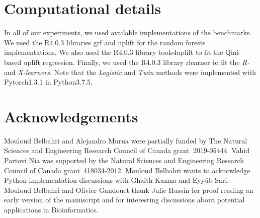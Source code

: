 \documentclass{article}
\let\proglang=\textsf
\newcommand{\pkg}[1]{{\fontseries{b}\selectfont #1}}
\begin{document}
\section*{Computational details}

In all of our experiments, we used available implementations of the benchmarks. We used the \proglang{R4.0.3} libraries \pkg{grf} \citep{tibshirani2019R_grf} and \pkg{uplift} \citep{guelman2014R_uplift} for the random forests implementations. We also used the \proglang{R4.0.3} library \pkg{tools4uplift} \citep{belba2020R_tools4uplift} to fit the Qini-based uplift regression. Finally, we used the \proglang{R4.0.3} library \pkg{rlearner} \citep{nie2020rlearner} to fit the {\it R-} and {\it X-learners}. Note that the {\it Logistic} and \textit{Twin}  methods were implemented with \pkg{Pytorch1.3.1} in \proglang{Python3.7.5}. %


\section*{Acknowledgements}
Mouloud Belbahri and Alejandro Murua were partially funded by The Natural Sciences and Engineering Research Council of Canada grant~2019-05444. Vahid Partovi Nia was supported by the Natural Sciences and Engineering Research Council of Canada grant~418034-2012. Mouloud Belbahri wants to acknowledge \proglang{Python} implementation discussions with Ghaith Kazma and Eyy{\"u}b Sari. Mouloud Belbahri and Olivier Gandouet thank Julie Hussin for proof reading an early version of the manuscript and for interesting discussions about potential applications in Bioinformatics.




\end{document}
